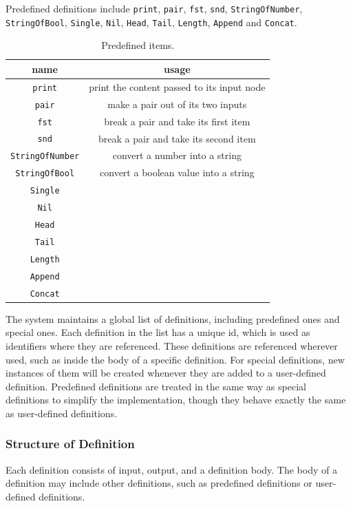 \documentclass[12pt,UTF8,a4]{article}
\newcommand{\code}[1]{\texttt{#1}}
\begin{document}
Predefined definitions include \code{print}, \code{pair}, \code{fst}, \code{snd}, \code{StringOfNumber}, \code{StringOfBool}, \code{Single}, \code{Nil}, \code{Head}, \code{Tail}, \code{Length}, \code{Append} and \code{Concat}.
\begin{table}[h]
\center
\begin{tabular}{c|c}
\hline
name & usage \\
\hline
\code{print} & print the content passed to its input node\\
\code{pair} & make a pair out of its two inputs\\
\code{fst} & break a pair and take its first item \\
\code{snd} & break a pair and take its second item \\
\code{StringOfNumber} & convert a number into a string\\
\code{StringOfBool} & convert a boolean value into a string \\
\code{Single} & \\
\code{Nil} & \\
\code{Head} & \\
\code{Tail} & \\
\code{Length} & \\
\code{Append} & \\
\code{Concat} & \\
\hline
\end{tabular}
\caption{Predefined items.}\label{tab:pitems}
\end{table}

The system maintains a global list of definitions, including predefined ones and special ones. Each definition in the list has a unique id, which is used as identifiers where they are referenced. These definitions are referenced wherever used, such as inside the body of a specific definition. For special definitions, new instances of them will be created whenever they are added to a user-defined definition. Predefined definitions are treated in the same way as special definitions to simplify the implementation, though they behave exactly the same as user-defined definitions.

\subsubsection{Structure of Definition}
Each definition consists of input, output, and a definition body. The body of a definition may include other definitions, such as predefined definitions or user-defined definitions.
\end{document}
